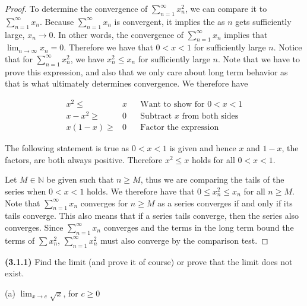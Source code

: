 \documentclass[12pt]{article}
\newcommand{\limit}[1]{\displaystyle \lim_{ {#1} }}
\newcommand{\limtoinf}[1][n]{\displaystyle\lim_{ {#1} \to \infty}}
\newcommand{\series}[2]{\displaystyle \sum_{ {#1} }^{ {#2} }}
\newcommand{\bN}{\mathbb{N}}
\begin{document}
\begin{proof}
	To determine the convergence of $\series{n=1}{\infty} x_n^2$, we can compare it to $\series{n=1}{\infty}x_n$. Because  $\series{n=1}{\infty}x_n$ is convergent, it implies the as $n$ gets sufficiently large, $x_n\to0$. In other words, the convergence of  $\series{n=1}{\infty}x_n$ implies that $\limtoinf x_n=0$. Therefore we have that $0<x<1$ for sufficiently large $n$. Notice that for $\series{n=1}{\infty} x_n^2$, we have $x_n^2\le x_n$ for sufficiently large $n$. Note that we have to prove this expression, and also that we only care about long term behavior as that is what ultimately determines convergence. We therefore have
	
\begin{align*}
	x^2\le&x&&\text{Want to show for }0<x<1 \\
	x - x^2\ge&0&&\text{Subtract }x\text{ from both sides} \\
	x(1-x)\ge&0&&\text{Factor the expression}
\end{align*} 

The following statement is true as $0<x<1$ is given and hence $x$ and $1-x$, the factors, are both always positive. Therefore $x^2\le x$ holds for all $0<x<1$.

Let $M\in\bN$ be given such that $n\ge M$, thus we are comparing the tails of the series when $0<x<1$ holds. We therefore have that $0\le x_n^2\le x_n$ for all $n\ge M$. Note that $\series{n=1}{\infty}x_n$ converges for $n\ge M$ as a series converges if and only if its tails converge. This also means that if a series tails converge, then the series also converges. Since $\series{n=1}{\infty}x_n$ converges and the terms in the long term bound the terms of $\sum x_n^2$, $\series{n=1}{\infty} x_n^2$  must also converge by the comparison test.
\end{proof}

\newpage

\noindent \textbf{(3.1.1)} Find the limit (and prove it of course) or prove that the limit does not exist.

\noindent (a) $\limit{x\to c} \sqrt{x}$, for $c\ge0$
\end{document}
